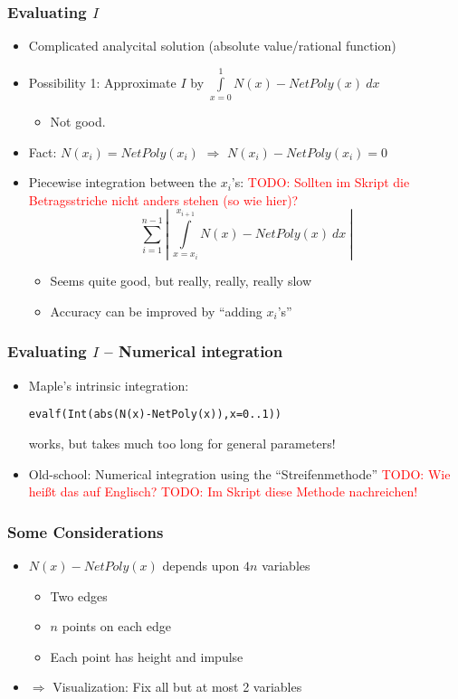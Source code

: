 \documentclass{beamer}
\newcommand{\todo}[1]{\textcolor{red}{TODO: #1}}
\begin{document}
\begin{frame}
  \frametitle{Evaluating $I$}
  \begin{itemize}
  \item Complicated analycital solution (absolute value/rational function)
  \item Possibility 1: Approximate $I$ by $\int\limits_{x=0}^1 N(x) - NetPoly(x) \  dx$
    \begin{itemize}
    \item Not good.
    \end{itemize}
  \item Fact: $N(x_i) = NetPoly(x_i)$ 
    $\Rightarrow$ $N(x_i) - NetPoly(x_i) = 0$
  \item Piecewise integration between the $x_i$'s: \todo{Sollten im Skript die Betragsstriche nicht anders stehen (so wie hier)?}
    \begin{equation*}
      \sum\limits_{i=1}^{n-1} \left|\ \int\limits_{x=x_i}^{x_{i+1}} N(x) - NetPoly(x) \  dx\ \right|
    \end{equation*}
    \begin{itemize}
    \item Seems quite good, but really, really, really slow
    \item Accuracy can be improved by ``adding $x_i$'s''
    \end{itemize}
  \end{itemize}
\end{frame}

\begin{frame}
  \frametitle{Evaluating $I$ -- Numerical integration}
  \begin{itemize}
  \item Maple's intrinsic integration:  
    \begin{center}
      \texttt{evalf(Int(abs(N(x)-NetPoly(x)),x=0..1))}
    \end{center}
    works, but takes much too long for general parameters!
  \item Old-school: Numerical integration using the ``Streifenmethode'' \todo{Wie heißt das auf Englisch?} \todo{Im Skript diese Methode nachreichen!}
  \end{itemize}
\end{frame}

\begin{frame}
  \frametitle{Some Considerations}
  \begin{itemize}
  \item $N(x)-NetPoly(x)$ depends upon $4n$ variables
    \begin{itemize}
    \item Two edges
    \item $n$ points on each edge
    \item Each point has height and impulse
    \end{itemize}
  \item $\Rightarrow$ Visualization: Fix all but at most 2 variables
  \end{itemize}
\end{frame}
\end{document}
